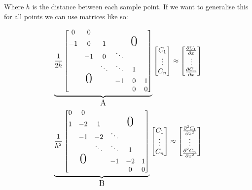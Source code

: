 \documentclass{article}
\begin{document}
{Where $h$ is the distance between each sample point. If we want to generalise this for all points we can use matrices like so:

\begin{equation} \label{CentralDifference}
    \begin{gathered}
        \underbrace{\frac{1}{2h}
        \begin{bmatrix}
        0 & 0 &  & & \\
        -1 & 0 & 1 & &\text{\huge{$0$}} & \\
         & -1 & 0 & \ddots &\\
         & & \ddots & \ddots & 1 \\
         & \text{\huge{$0$}} & & -1 & 0 & 1 \\
         & & & & 0 & 0
        \end{bmatrix}}_\text{\large{A}}
        \begin{bmatrix}
            C_1 \\ \vdots \\ C_n
        \end{bmatrix}
        \approx
        \begin{bmatrix}
            \frac{\partial C_1}{\partial x} \\ \vdots \\ \frac{\partial C_n}{\partial x}
        \end{bmatrix} \\
        \underbrace{\frac{1}{h^2}
        \begin{bmatrix}
        0 & 0 &  & & \\
        1 & -2 & 1 & &\text{\huge{$0$}} & \\
         & -1 & -2 & \ddots &\\
         & & \ddots & \ddots & 1 \\
         & \text{\huge{$0$}} & & -1 & -2 & 1 \\
         & & & & 0 & 0
        \end{bmatrix}}_\text{\large{B}}
        \begin{bmatrix}
            C_1 \\ \vdots \\ C_n
        \end{bmatrix} \approx
        \begin{bmatrix}
            \frac{\partial^2 C_1}{\partial x^2} \\ \vdots \\ \frac{\partial^2 C_n}{\partial x^2}
        \end{bmatrix}
    \end{gathered}
\end{equation}

}
\end{document}
